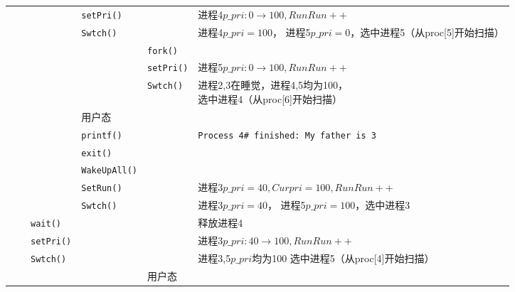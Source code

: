 \begin{landscape}
\begin{longtable}{llllll}
                 &                      &     & \texttt{setPri()}    &                        &进程4$p\_pri:0\rightarrow 100,RunRun++$ \\
                 &                      &     &\texttt{Swtch()}    &              &\makecell[l]{进程4$p\_pri=100$，\\进程5$p\_pri=0$，选中进程5（从proc[5]开始扫描）} \\
                 &                      &     &                &              \texttt{fork()}    &\\
                 &                      &     &                &              \texttt{setPri()}    &进程5$p\_pri:0\rightarrow 100,RunRun++$ \\
                 &                      &     &                &              \texttt{Swtch()}     &\makecell[l]{进程2,3在睡觉，进程4,5均为100，\\选中进程4（从proc[6]开始扫描）} \\
                 &                      &     & 用户态          &             & \\
                 &                      &     & \texttt{printf()}          &             & \texttt{Process 4\# finished: My father is 3}\\
                 &                      &     & \texttt{exit()}          &             & \\
                 &                      &     & \texttt{WakeUpAll()}          &             & \\
                 &                      &     & \texttt{SetRun()}          &             & 进程3$p\_pri=40,Curpri=100,RunRun++$\\
                 &                      &     & \texttt{Swtch()}          &             &\makecell[l]{进程3$p\_pri=40$，\\进程5$p\_pri=100$，选中进程3}\\
                 &                      & \texttt{wait()}    &           &             & 释放进程4\\
                 &                      & \texttt{setPri()}    &           &             &进程3$p\_pri:40\rightarrow 100,RunRun++$ \\
                 &                      & \texttt{Swtch()}    &           &             & \makecell[l]{进程3,5$p\_pri$均为100\\选中进程5（从proc[4]开始扫描）}\\
                 &                      &     &                &             用户态    & \\

\end{longtable}
\end{landscape}
